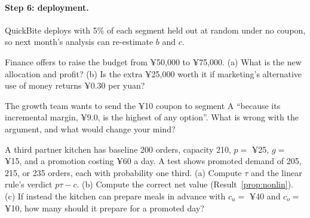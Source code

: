 \documentclass[11pt]{article}
\begin{document}
\paragraph{Step 6: deployment.} QuickBite deploys with 5\% of each segment held out at random under no coupon, so next month's
analysis can re-estimate $b$ and $c$.

\begin{exercise}[computation]
Finance offers to raise the budget from ¥50{,}000 to ¥75{,}000. (a) What is the new allocation and profit? (b) Is the extra ¥25{,}000
worth it if marketing's alternative use of money returns ¥0.30 per yuan?
\end{exercise}

\begin{exercise}[judgment]
The growth team wants to send the ¥10 coupon to segment A ``because its incremental margin, ¥9.0, is the highest of any option''.
What is wrong with the argument, and what would change your mind?
\end{exercise}

\begin{exercise}[computation]
A third partner kitchen has baseline 200 orders, capacity 210, $p = $ ¥25, $g = $ ¥15, and a promotion costing ¥60 a day. A test
shows promoted demand of 205, 215, or 235 orders, each with probability one third. (a) Compute $\tau$ and the linear rule's
verdict $p\tau - c$. (b) Compute the correct net value (Result~\ref{prop:nonlin}). (c) If instead the kitchen can prepare meals in
advance with $c_u = $ ¥40 and $c_o = $ ¥10, how many should it prepare for a promoted day?
\end{exercise}
\end{document}
